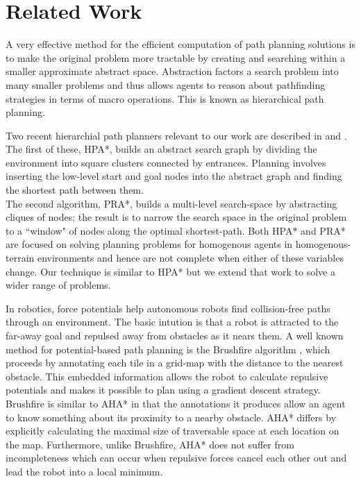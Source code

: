 \section{Related Work}
A very effective method for the efficient computation of path planning solutions is to make the original problem more tractable by creating and searching within a smaller approximate abstract space. Abstraction factors a search problem into many smaller problems and thus allows agents to reason about pathfinding strategies in terms of macro operations. This is known as hierarchical path planning. 
\par
\indent Two recent hierarchial path planners relevant to our work are described in \cite{botea04} and \cite{sturtevant05}. The first of these, HPA*, builds an  abstract search graph by dividing the environment into square clusters connected by entrances. Planning involves inserting the low-level start and goal nodes into the abstract graph and finding the shortest path between them. \\
The second algorithm, PRA*, builds a multi-level search-space by abstracting cliques of nodes; the result is to narrow the search space in the original problem to a ``window" of nodes along the optimal shortest-path.
Both HPA* and PRA* are focused on solving planning problems for homogenous agents in homogenous-terrain environments and hence are not complete when either of these variables change. 
Our technique is similar to HPA* but we extend that work to solve a wider range of problems. 
\par 
\indent In robotics, force potentials help autonomous robots find collision-free paths through an environment. The basic intution is that a robot is attracted to the far-away goal and repulsed away from obstacles as it nears them. A well known method for potential-based path planning is the Brushfire algorithm \cite{latombe91}, which proceeds by annotating each tile in a grid-map with the distance to the nearest obstacle. This embedded information allows the robot to calculate repulsive potentials and makes it possible to plan using a gradient descent strategy. 
Brushfire is similar to AHA* in that the annotations it produces allow an agent to know something about its proximity to a nearby obstacle. 
AHA* differs by explicitly calculating the maximal size of traversable space at each location on the map. 
Furthermore, unlike Brushfire, AHA* does not suffer from incompleteness which can occur when repulsive forces cancel each other out and lead the robot into a local minimum. 
\par

